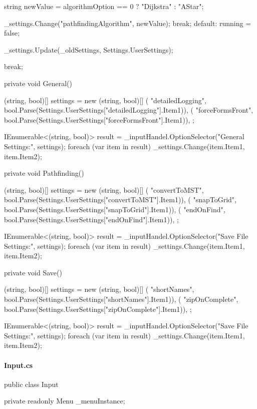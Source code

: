 \begin{flushleft}
\begin{cscode}
{{{{                    string newValue = algorithmOption == 0 ? "Dijkstra" : "AStar";

                    _settings.Change("pathfindingAlgorithm", newValue);
                    break;
                default:
                    running = false;

                    _settings.Update(_oldSettings, Settings.UserSettings);

                    break;

            }
        }
    }

    private void General()
    {
        (string, bool)[] settings = new (string, bool)[] {
            ( "detailedLogging", bool.Parse(Settings.UserSettings["detailedLogging"].Item1)),
            ( "forceFormsFront", bool.Parse(Settings.UserSettings["forceFormsFront"].Item1)),
        };

        IEnumerable<(string, bool)> result = _inputHandel.OptionSelector("General Settings:", settings);
        foreach (var item in result) _settings.Change(item.Item1, item.Item2);
    }

    private void Pathfinding()
    {
        (string, bool)[] settings = new (string, bool)[] {
            ( "convertToMST", bool.Parse(Settings.UserSettings["convertToMST"].Item1)),
            ( "snapToGrid", bool.Parse(Settings.UserSettings["snapToGrid"].Item1)),
            ( "endOnFind", bool.Parse(Settings.UserSettings["endOnFind"].Item1)),
        };

        IEnumerable<(string, bool)> result = _inputHandel.OptionSelector("Save File Settings:", settings);
        foreach (var item in result) _settings.Change(item.Item1, item.Item2);
    }

    private void Save()
    {
        (string, bool)[] settings = new (string, bool)[] {
            ( "shortNames", bool.Parse(Settings.UserSettings["shortNames"].Item1)),
            ( "zipOnComplete", bool.Parse(Settings.UserSettings["zipOnComplete"].Item1)),
        };

        IEnumerable<(string, bool)> result = _inputHandel.OptionSelector("Save File Settings:", settings);
        foreach (var item in result) _settings.Change(item.Item1, item.Item2);
    }

}
    \end{cscode}
\pagebreak
    
    
    \paragraph{Input.cs}
    \begin{cscode}
public class Input
{
    private readonly Menu _menuInstance;

}
\end{cscode}
\end{flushleft}
